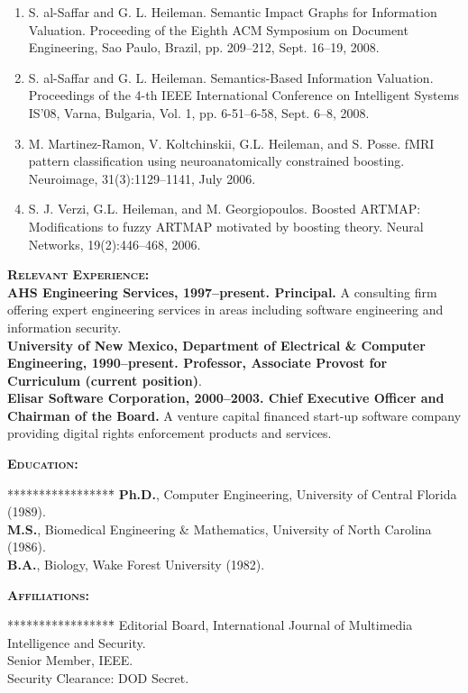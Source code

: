 \documentclass{sbir}
\begin{document}
{{\begin{enumerate}
\item S. al-Saffar and G. L. Heileman. Semantic Impact Graphs for Information Valuation. Proceeding of the Eighth ACM Symposium on Document Engineering, Sao Paulo, Brazil, pp. 209--212, Sept. 16--19, 2008.
\item S. al-Saffar and G. L. Heileman. Semantics-Based Information Valuation. Proceedings of the 4-th IEEE International Conference on Intelligent Systems IS'08, Varna, Bulgaria, Vol. 1, pp. 6-51--6-58, Sept. 6--8, 2008.
\item M. Martinez-Ramon, V. Koltchinskii, G.L. Heileman, and S. Posse. fMRI pattern classification using neuroanatomically constrained boosting. Neuroimage, 31(3):1129--1141, July 2006.
\item S. J. Verzi, G.L. Heileman, and M. Georgiopoulos. Boosted {ARTMAP}: Modifications to fuzzy ARTMAP motivated by boosting theory. Neural Networks, 19(2):446--468, 2006.
\end{enumerate}
\textbf{\textsc{Relevant Experience:}}~\\
{\bfseries AHS Engineering Services, 1997--present. Principal.} A consulting firm offering expert engineering services in areas including software engineering and information security.~\\
{\bfseries University of New Mexico, Department of Electrical \& Computer Engineering, 1990--present. Professor, Associate Provost for Curriculum (current position)}.~\\
{\bfseries Elisar Software Corporation, 2000--2003. Chief Executive Officer and Chairman of the Board.} A venture capital financed start-up software company providing digital rights enforcement products and services.

\textbf{\textsc{Education:}}
\vspace{-30pt}
\begin{tabbing}*****************\=\kill
 \> {\bfseries Ph.D.}, Computer Engineering, University of Central Florida (1989). \\
 \> {\bfseries M.S.}, Biomedical Engineering \& Mathematics, University of North Carolina (1986). \\
 \> {\bfseries B.A.}, Biology, Wake Forest University (1982).
\end{tabbing}

\textbf{\textsc{Affiliations:}}
\vspace{-30pt}
\begin{tabbing}*****************\=\kill
\> Editorial Board,  International Journal of Multimedia Intelligence and Security.  \\
\> Senior Member, IEEE. \\
\> Security Clearance: DOD Secret.
\end{tabbing}

}}
\end{document}
